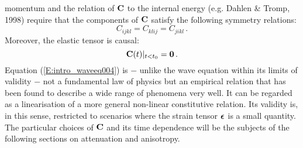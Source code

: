 momentum and the relation of $\mathbf{C}$ to the internal energy (e.g.
Dahlen \& Tromp, 1998) require that the components of $\mathbf{C}$
satisfy the following symmetry relations:
\begin{equation}\label{E:intro_waveeq005}
C_{ijkl}=C_{klij}=C_{jikl}\,.
\end{equation}
Moreover, the elastic tensor is causal:
\begin{equation}\label{E:into_waveeq006}
\mathbf{C}(t)|_{t<t_0}=\mathbf{0}\,.
\end{equation}
Equation (\ref{E:intro_waveeq004}) is $-$ unlike the wave equation
within its limits of validity $-$ not a fundamental law of physics
but an empirical relation that has been found to describe a wide
range of phenomena very well. It can be regarded as a linearisation
of a more general non-linear constitutive relation. Its validity is,
in this sense, restricted to scenarios where the strain tensor
$\boldsymbol{\epsilon}$ is a small quantity. The particular choices of
$\mathbf{C}$ and its time dependence will be the subjects of the
following sections on attenuation and anisotropy.

